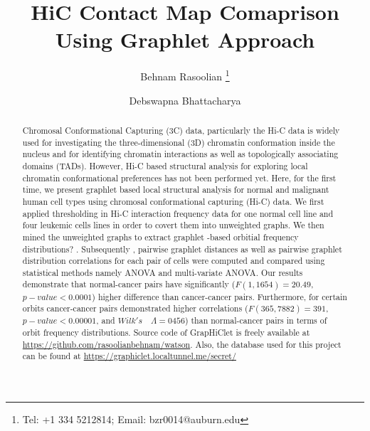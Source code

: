 \documentclass[]{article}
\title{HiC Contact Map Comaprison Using Graphlet Approach}
\author[1]{Behnam Rasoolian \thanks{Tel: +1 334 5212814; Email: bzr0014@auburn.edu}}
\author[1]{Debswapna Bhattacharya}
\affil[1]{Department of Computer Science and Software Engineering, Auburn University}
\date{}
\begin{document}
\maketitle

\begin{abstract}
    Chromosal Conformational Capturing (3C) data,
    particularly the Hi-C data is widely used for
    investigating the three-dimensional (3D) 
    chromatin conformation inside the nucleus and
    for identifying chromatin interactions as 
    well as topologically associating domains 
    (TADs). However, Hi-C based structural analysis
    for exploring local chromatin conformational 
    preferences has not been performed yet. 
    Here, for the first time, we present graphlet
    based local structural analysis for normal 
    and malignant human cell types  using chromosal
    conformational capturing (Hi-C) data. 
    We first applied thresholding in Hi-C interaction
    frequency data for one normal cell line and 
    four leukemic cells lines in order to covert 
    them into unweighted graphs. We then mined 
    the unweighted graphs to extract graphlet -based 
    orbitial frequency distributions? . Subsequently
    , pairwise graphlet distances as well as 
    pairwise graphlet distribution correlations 
    for each pair of cells were computed and 
    compared using statistical methods namely 
    ANOVA and multi-variate ANOVA. Our results 
    demonstrate that normal-cancer pairs have 
    significantly ($F(1, 1654) = 20.49$, $p-value
    < 0.0001$) higher difference than cancer-cancer 
    pairs. Furthermore, for certain orbits cancer-cancer 
    pairs demonstrated higher correlations 
    ($F(365, 7882)=391$, $p-value<0.00001$, and 
    $Wilk's \quad \Lambda=0456$) than normal-cancer pairs 
    in terms of orbit frequency distributions. 
    Source code of GrapHiClet 
    is freely available at 
    \url{https://github.com/rasoolianbehnam/watson}.
    Also, the database used for this project can be
    found at \url{https://graphiclet.localtunnel.me/secret/}
\end{abstract}
\end{document}
